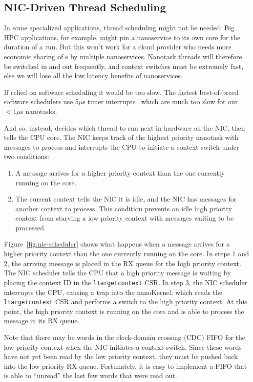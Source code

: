 \subsection{NIC-Driven Thread Scheduling}
\label{ssec:thread-scheduler}
In some specialized applications, thread scheduling might not be needed: Big HPC applications, for example, might pin a nanoservice to its own core for the duration of a run. But this won't work for a cloud provider who needs more economic sharing of \name{}s by multiple nanoservices.
Nanotask threads will therefore be switched in and out frequently, and context switches must be extremely fast, else we will lose all the low latency benefits of nanoservices.

If \name{} relied on software scheduling it would be too slow. The fastest best-of-breed software schedulers use 5$\mu$s timer interrupts~\cite{shinjuku, shenango} which are much too slow for our $<1\mu$s nanotasks.

And so, instead, \name{} decides which thread to run next in hardware on the NIC, then tells the CPU core. The NIC keeps track of the highest priority nanotask with messages to process and interrupts the CPU to initiate a context switch under two conditions:
\begin{enumerate}
    \item A message arrives for a higher priority context than the one currently running on the core.
    \item The current context tells the NIC it is idle, and the NIC has messages for another context to process. This condition prevents an idle high priority context from starving a low priority context with messages waiting to be processed.
\end{enumerate}

Figure~\ref{fig:nic-scheduler} shows what happens when a message arrives for a higher priority context than the one currently running on the core. In steps 1 and 2, the arriving message is placed in the RX queue for the high priority context. The NIC scheduler tells the CPU that a high priority message is waiting by placing the context ID in the \texttt{ltargetcontext} CSR. In step 3, the NIC scheduler interrupts the CPU, causing a trap into the nanoKernel, which reads the \texttt{ltargetcontext} CSR and performs a switch to the high priority context. At this point, the high priority context is running on the core and is able to process the message in its RX queue.

 Note that there may be words in the clock-domain crossing (CDC) FIFO for the low priority context when the NIC initiates a context switch.
Since these words have not yet been read by the low priority context, they must be pushed back into the low priority RX queue.
Fortunately, it is easy to implement a FIFO that is able to ``unread'' the last few words that were read out.

